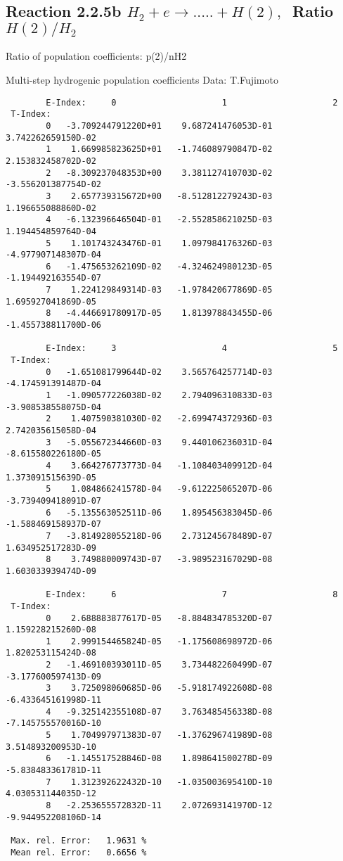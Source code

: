 \documentclass[12pt]{article}
\begin{document}
\subsection{
Reaction 2.2.5b  $H_2 + e \rightarrow .....+H(2)   , \  $
Ratio $H(2)/H_2 $
}

 Ratio of population coefficients: p(2)/nH2

 Multi-step hydrogenic population coefficients
 Data: T.Fujimoto


\begin{small}\begin{verbatim}
        E-Index:     0                     1                     2
 T-Index:
        0   -3.709244791220D+01    9.687241476053D-01    3.742262659150D-02
        1    1.669985823625D+01   -1.746089790847D-02    2.153832458702D-02
        2   -8.309237048353D+00    3.381127410703D-02   -3.556201387754D-02
        3    2.657739315672D+00   -8.512812279243D-03    1.196655088860D-02
        4   -6.132396646504D-01   -2.552858621025D-03    1.194454859764D-04
        5    1.101743243476D-01    1.097984176326D-03   -4.977907148307D-04
        6   -1.475653262109D-02   -4.324624980123D-05   -1.194492163554D-07
        7    1.224129849314D-03   -1.978420677869D-05    1.695927041869D-05
        8   -4.446691780917D-05    1.813978843455D-06   -1.455738811700D-06

        E-Index:     3                     4                     5
 T-Index:
        0   -1.651081799644D-02    3.565764257714D-03   -4.174591391487D-04
        1   -1.090577226038D-02    2.794096310833D-03   -3.908538558075D-04
        2    1.407590381030D-02   -2.699474372936D-03    2.742035615058D-04
        3   -5.055672344660D-03    9.440106236031D-04   -8.615580226180D-05
        4    3.664276773773D-04   -1.108403409912D-04    1.373091515639D-05
        5    1.084866241578D-04   -9.612225065207D-06   -3.739409418091D-07
        6   -5.135563052511D-06    1.895456383045D-06   -1.588469158937D-07
        7   -3.814928055218D-06    2.731245678489D-07    1.634952517283D-09
        8    3.749880009743D-07   -3.989523167029D-08    1.603033939474D-09

        E-Index:     6                     7                     8
 T-Index:
        0    2.688883877617D-05   -8.884834785320D-07    1.159228215260D-08
        1    2.999154465824D-05   -1.175608698972D-06    1.820253115424D-08
        2   -1.469100393011D-05    3.734482260499D-07   -3.177600597413D-09
        3    3.725098060685D-06   -5.918174922608D-08   -6.433645161998D-11
        4   -9.325142355108D-07    3.763485456338D-08   -7.145755570016D-10
        5    1.704997971383D-07   -1.376296741989D-08    3.514893200953D-10
        6   -1.145517528846D-08    1.898641500278D-09   -5.838483361781D-11
        7    1.312392622432D-10   -1.035003695410D-10    4.030531144035D-12
        8   -2.253655572832D-11    2.072693141970D-12   -9.944952208106D-14

 Max. rel. Error:   1.9631 %
 Mean rel. Error:   0.6656 %


\end{verbatim}\end{small}
\end{document}

